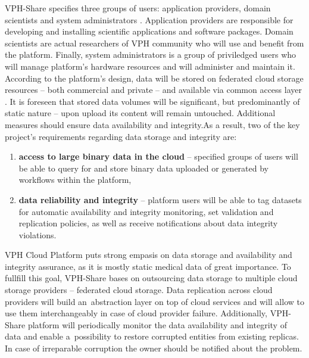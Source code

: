 VPH-Share specifies three groups of users:
application providers, domain scientists and system administrators \cite{vph-deliverable-2-2}. Application providers
are responsible for developing and installing scientific applications and software packages.
Domain scientists are actual researchers of VPH community who will use and benefit from 
the platform. Finally, system administrators is a group of priviledged users who will
manage platform's hardware resources and will administer and maintain it.\\

According to the platform's design, data will be stored on federated cloud storage resources --
both commercial and private -- and available via common access layer \cite{vph-deliverable-2-2}. It is foreseen that stored
data volumes will be significant, but predominantly of static nature -- upon upload its content will
remain untouched. Additional measures should ensure data availability and integrity.As a result, two
of the key project's requirements regarding data storage and integrity are:

\begin{enumerate}
\item \textbf{access to large binary data in the cloud} -- specified groups of users will
be able to query for and store binary data uploaded or generated by workflows within the platform, 
\item \textbf{data reliability and integrity} -- platform users will be able to tag datasets
for automatic availability and integrity monitoring, set validation and replication policies,
as well as receive notifications about data integrity violations.
\end{enumerate}

VPH Cloud Platform puts strong empasis on data storage and availability and
integrity assurance, as it is mostly static medical data of great importance.
To fullfill this goal, VPH-Share bases on outsourcing data storage to multiple cloud storage
providers -- federated cloud storage. Data replication across cloud providers will
build an~abstraction layer on top of cloud services and will allow to use them interchangeably
in case of cloud provider failure. Additionally, VPH-Share platform will periodically monitor
the data availability and integrity of data and enable a~possibility to restore corrupted
entities from existing replicas. In case of irreparable corruption the owner should be notified
about the problem.\\

